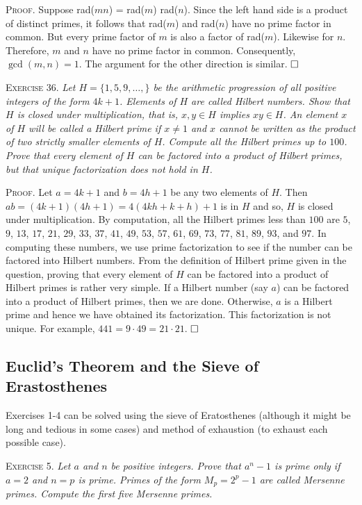 \documentclass[11pt, leqno]{article}
\newcommand{\done}{\ensuremath{\hfill\square}}
\begin{document}
\textsc{Proof}. Suppose rad($mn$) = rad($m$) rad($n$). Since the left hand side is a product of distinct primes, it follows that rad($m$) and rad($n$) have no prime factor in common. But every prime factor of $m$ is also a factor of rad($m$). Likewise for $n$. Therefore, $m$ and $n$ have no prime factor in common. Consequently, $\gcd(m,n) = 1$. The argument for the other direction is similar. \done

\textsc{Exercise 36}. \emph{Let $H = \{1, 5, 9, \ldots,\}$ be the arithmetic progression of all positive integers of the form $4k + 1$. Elements of $H$ are called Hilbert numbers. Show that $H$ is closed under multiplication, that is, $x, y \in H$ implies $xy \in H$. An element $x$ of $H$ will be called a Hilbert prime if $x\ne 1$ and $x$ cannot be written as the product of two strictly smaller elements of $H$. Compute all the Hilbert primes up to $100$. Prove that every element of $H$ can be factored into a product of Hilbert primes, but that unique factorization does not hold in $H$.}

\textsc{Proof}. Let $a = 4k + 1$ and $b = 4h + 1$ be any two elements of $H$. Then $ab = (4k + 1)(4h + 1) = 4(4kh + k + h) + 1$ is in $H$ and so, $H$ is closed under multiplication. By computation, all the Hilbert primes less than $100$ are $5$, $9$, $13$, $17$, $21$, $29$, $33$, $37$, $41$, $49$, $53$, $57$, $61$, $69$, $73$, $77$, $81$, $89$, $93$, and $97$. In computing these numbers, we use prime factorization to see if the number can be factored into Hilbert numbers. From the definition of Hilbert prime given in the question, proving that every element of $H$ can be factored into a product of Hilbert primes is rather very simple. If a Hilbert number (say $a$) can be factored into a product of Hilbert primes, then we are done. Otherwise, $a$ is a Hilbert prime and hence we have obtained its factorization. This factorization is not unique. For example, $441 = 9 \cdot 49 = 21 \cdot 21$. \done

\subsection{Euclid's Theorem and the Sieve of Erastosthenes}

Exercises 1-4 can be solved using the sieve of Eratosthenes (although it might be long and tedious in some cases) and method of exhaustion (to exhaust each possible case).

\textsc{Exercise 5}. \emph{Let $a$ and $n$ be positive integers. Prove that $a^n-1$ is prime only if $a=2$ and $n=p$ is prime. Primes of the form $M_p = 2^p - 1$ are called Mersenne primes. Compute the first five Mersenne primes.}
\end{document}
